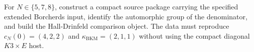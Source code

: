 \begin{problem}
\label{prob:boundary-source-packages-two-tower-note}
For \(N\in\{5,7,8\}\), construct a compact source package carrying the
specified extended Borcherds input, identify the automorphic group of
the denominator, and build the Hall-Drinfeld comparison object. The
data must reproduce \(c_N(0)=(4,2,2)\) and
\(\kappa_{\mathrm{BKM}}=(2,1,1)\) without using the compact diagonal
\(K3\times E\) host.
\end{problem}
